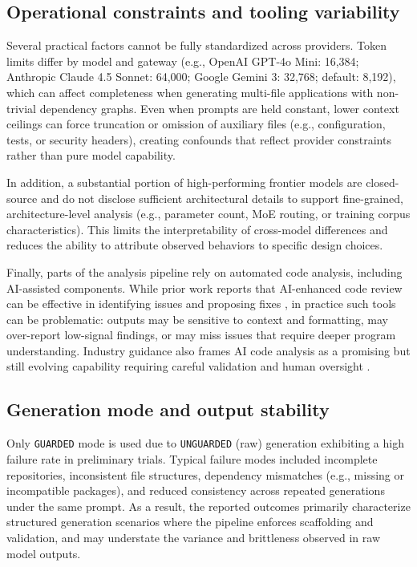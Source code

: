 \subsection{Operational constraints and tooling variability}

Several practical factors cannot be fully standardized across providers. Token limits differ by model and gateway (e.g., OpenAI GPT-4o Mini: 16,384; Anthropic Claude 4.5 Sonnet: 64,000; Google Gemini 3: 32,768; default: 8,192), which can affect completeness when generating multi-file applications with non-trivial dependency graphs. Even when prompts are held constant, lower context ceilings can force truncation or omission of auxiliary files (e.g., configuration, tests, or security headers), creating confounds that reflect provider constraints rather than pure model capability.

In addition, a substantial portion of high-performing frontier models are closed-source and do not disclose sufficient architectural details to support fine-grained, architecture-level analysis (e.g., parameter count, MoE routing, or training corpus characteristics). This limits the interpretability of cross-model differences and reduces the ability to attribute observed behaviors to specific design choices.

Finally, parts of the analysis pipeline rely on automated code analysis, including AI-assisted components. While prior work reports that AI-enhanced code review can be effective in identifying issues and proposing fixes \cite{almeida_aicodereview_2024}, in practice such tools can be problematic: outputs may be sensitive to context and formatting, may over-report low-signal findings, or may miss issues that require deeper program understanding. Industry guidance also frames AI code analysis as a promising but still evolving capability requiring careful validation and human oversight \cite{gitlab_ai_code_analysis_2026}.

\subsection{Generation mode and output stability}

Only \texttt{GUARDED} mode is used due to \texttt{UNGUARDED} (raw) generation exhibiting a high failure rate in preliminary trials. Typical failure modes included incomplete repositories, inconsistent file structures, dependency mismatches (e.g., missing or incompatible packages), and reduced consistency across repeated generations under the same prompt. As a result, the reported outcomes primarily characterize structured generation scenarios where the pipeline enforces scaffolding and validation, and may understate the variance and brittleness observed in raw model outputs.

